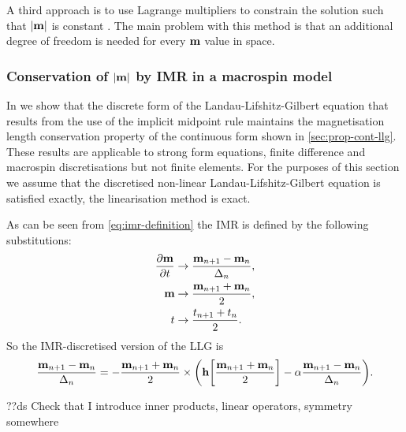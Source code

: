 A third approach is to use Lagrange multipliers to constrain the solution such that $\left|{\mathbf{m}} \right|$ is constant \cite{Szambolics2008a}.
The main problem with this method is that an additional degree of freedom is needed for every $\mathbf{m}$ value in space.

\subsubsection{Conservation of $\left|{\mathbf{m}} \right|$ by IMR in a macrospin model}
\label{sec:proof-magn-length-ode-imr-llg}

In  we show that the discrete form of the Landau-Lifshitz-Gilbert equation that results from the use of the implicit midpoint rule maintains the magnetisation length conservation property of the continuous form shown in \cref{sec:prop-cont-llg}.
These results are applicable to strong form equations, \ie finite difference and macrospin discretisations but not finite elements.
For the purposes of this section we assume that the discretised non-linear Landau-Lifshitz-Gilbert equation is satisfied exactly, \ie the linearisation method is exact.

As can be seen from \cref{eq:imr-definition} the IMR is defined by the following substitutions:
\begin{equation}
\begin{aligned}
  \label{eq:55}
  \frac{\partial \mathbf{m}}{\partial t} &\rightarrow \frac{\mathbf{m}_{n+1} - \mathbf{m}_n}{\Delta_{n}}, \\
  \mathbf{m} &\rightarrow \frac{\mathbf{m}_{n+1} + \mathbf{m}_n}{2}, \\
  t &\rightarrow \frac{t_{n+1} + t_n}{2}.
\end{aligned}
\end{equation}
So the IMR-discretised version of the LLG is
\begin{equation}
  \frac{\mathbf{m}_{n+1} - \mathbf{m}_n}{\Delta_{n}} = - \frac{\mathbf{m}_{n+1} + \mathbf{m}_n}{2} \times
  {\left( \mathbf{h}{\left[ \frac{\mathbf{m}_{n+1} + \mathbf{m}_n}{2} \right]} - \alpha\frac{\mathbf{m}_{n+1} - \mathbf{m}_n}{\Delta_{n}} \right)}.
  \label{eqn:disc-llg}
\end{equation}

??ds Check that I introduce inner products, linear operators, symmetry somewhere

